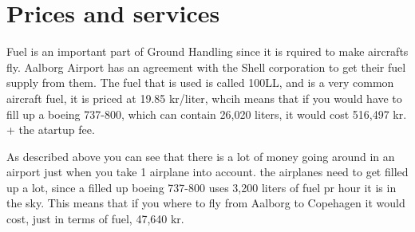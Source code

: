 \section{Prices and services}

Fuel is an important part of Ground Handling since it is rquired to make aircrafts fly. Aalborg Airport has an agreement with the Shell corporation to get their fuel supply from them. The fuel that is used is called 100LL, and is a very common aircraft fuel, it is priced at 19.85 kr/liter, whcih means that if you would have to fill up a boeing 737-800, which can contain 26,020 liters, it would cost 516,497 kr. + the atartup fee.

As described above you can see that there is a lot of money going around in an airport just when you take 1 airplane into account. the airplanes need to get filled up a lot, since a filled up boeing 737-800 uses 3,200 liters of fuel pr hour it is in the sky. This means that if you where to fly from Aalborg to Copehagen it would cost, just in terms of fuel, 47,640 kr.

